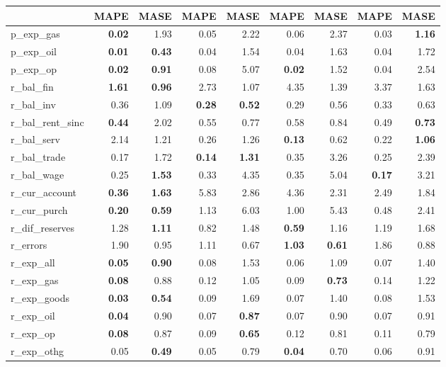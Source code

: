\documentclass[a4paper, 14pt]{extarticle}
\begin{document}
\begin{center}
\begin{tabular}{l|rr|rr|rr|rr}
		&MAPE & MASE & MAPE & MASE & MAPE & MASE & MAPE & MASE \\ 
		\midrule
		p\_exp\_gas & \textbf{0.02} & 1.93 & 0.05 & 2.22 & 0.06 & 2.37 & 0.03 & \textbf{1.16} \\ 
		p\_exp\_oil & \textbf{0.01} & \textbf{0.43} & 0.04 & 1.54 & 0.04 & 1.63 & 0.04 & 1.72 \\ 
		p\_exp\_op & \textbf{0.02} & \textbf{0.91} & 0.08 & 5.07 & \textbf{0.02} & 1.52 & 0.04 & 2.54 \\ 
		r\_bal\_fin & \textbf{1.61} & \textbf{0.96} & 2.73 & 1.07 & 4.35 & 1.39 & 3.37 & 1.63 \\ 
		r\_bal\_inv & 0.36 & 1.09 & \textbf{0.28} & \textbf{0.52} & 0.29 & 0.56 & 0.33 & 0.63 \\ 
		r\_bal\_rent\_sinc & \textbf{0.44} & 2.02 & 0.55 & 0.77 & 0.58 & 0.84 & 0.49 & \textbf{0.73} \\ 
		r\_bal\_serv & 2.14 & 1.21 & 0.26 & 1.26 & \textbf{0.13} & 0.62 & 0.22 & \textbf{1.06} \\ 
		r\_bal\_trade & 0.17 & 1.72 & \textbf{0.14} & \textbf{1.31} & 0.35 & 3.26 & 0.25 & 2.39 \\ 
		r\_bal\_wage & 0.25 & \textbf{1.53} & 0.33 & 4.35 & 0.35 & 5.04 & \textbf{0.17} & 3.21 \\ 
		r\_cur\_account & \textbf{0.36} & \textbf{1.63} & 5.83 & 2.86 & 4.36 & 2.31 & 2.49 & 1.84 \\ 
		r\_cur\_purch & \textbf{0.20} & \textbf{0.59} & 1.13 & 6.03 & 1.00 & 5.43 & 0.48 & 2.41 \\ 
		r\_dif\_reserves & 1.28 & \textbf{1.11} & 0.82 & 1.48 & \textbf{0.59} & 1.16 & 1.19 & 1.68 \\ 
		r\_errors & 1.90 & 0.95 & 1.11 & 0.67 & \textbf{1.03} & \textbf{0.61} & 1.86 & 0.88 \\ 
		r\_exp\_all & \textbf{0.05} & \textbf{0.90} & 0.08 & 1.53 & 0.06 & 1.09 & 0.07 & 1.40 \\ 
		r\_exp\_gas & \textbf{0.08} & 0.88 & 0.12 & 1.05 & 0.09 & \textbf{0.73} & 0.14 & 1.22 \\ 
		r\_exp\_goods & \textbf{0.03} & \textbf{0.54} & 0.09 & 1.69 & 0.07 & 1.40 & 0.08 & 1.53 \\ 
		r\_exp\_oil &\textbf{0.04} & 0.90 & 0.07 & \textbf{0.87} & 0.07 & 0.90 & 0.07 & 0.91 \\ 
		r\_exp\_op & \textbf{0.08} & 0.87 & 0.09 & \textbf{0.65} & 0.12 & 0.81 & 0.11 & 0.79 \\ 
		r\_exp\_othg & 0.05 & \textbf{0.49} & 0.05 & 0.79 & \textbf{0.04} & 0.70 & 0.06 & 0.91 \\ 

\end{tabular}
\end{center}
\end{document}

